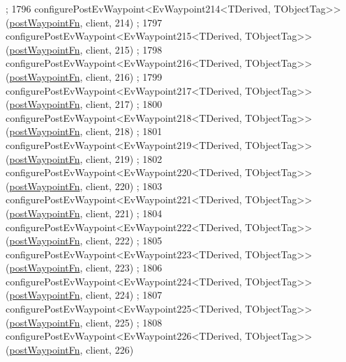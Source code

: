 \begin{DoxyCode}
      ;
1796     configurePostEvWaypoint<EvWaypoint214<TDerived, TObjectTag>>(\hyperlink{classcl__move__base__z_1_1WaypointEventDispatcher_a964a57fcce5d48ec60243230722d8dd7}{postWaypointFn}, client, 214)
      ;
1797     configurePostEvWaypoint<EvWaypoint215<TDerived, TObjectTag>>(\hyperlink{classcl__move__base__z_1_1WaypointEventDispatcher_a964a57fcce5d48ec60243230722d8dd7}{postWaypointFn}, client, 215)
      ;
1798     configurePostEvWaypoint<EvWaypoint216<TDerived, TObjectTag>>(\hyperlink{classcl__move__base__z_1_1WaypointEventDispatcher_a964a57fcce5d48ec60243230722d8dd7}{postWaypointFn}, client, 216)
      ;
1799     configurePostEvWaypoint<EvWaypoint217<TDerived, TObjectTag>>(\hyperlink{classcl__move__base__z_1_1WaypointEventDispatcher_a964a57fcce5d48ec60243230722d8dd7}{postWaypointFn}, client, 217)
      ;
1800     configurePostEvWaypoint<EvWaypoint218<TDerived, TObjectTag>>(\hyperlink{classcl__move__base__z_1_1WaypointEventDispatcher_a964a57fcce5d48ec60243230722d8dd7}{postWaypointFn}, client, 218)
      ;
1801     configurePostEvWaypoint<EvWaypoint219<TDerived, TObjectTag>>(\hyperlink{classcl__move__base__z_1_1WaypointEventDispatcher_a964a57fcce5d48ec60243230722d8dd7}{postWaypointFn}, client, 219)
      ;
1802     configurePostEvWaypoint<EvWaypoint220<TDerived, TObjectTag>>(\hyperlink{classcl__move__base__z_1_1WaypointEventDispatcher_a964a57fcce5d48ec60243230722d8dd7}{postWaypointFn}, client, 220)
      ;
1803     configurePostEvWaypoint<EvWaypoint221<TDerived, TObjectTag>>(\hyperlink{classcl__move__base__z_1_1WaypointEventDispatcher_a964a57fcce5d48ec60243230722d8dd7}{postWaypointFn}, client, 221)
      ;
1804     configurePostEvWaypoint<EvWaypoint222<TDerived, TObjectTag>>(\hyperlink{classcl__move__base__z_1_1WaypointEventDispatcher_a964a57fcce5d48ec60243230722d8dd7}{postWaypointFn}, client, 222)
      ;
1805     configurePostEvWaypoint<EvWaypoint223<TDerived, TObjectTag>>(\hyperlink{classcl__move__base__z_1_1WaypointEventDispatcher_a964a57fcce5d48ec60243230722d8dd7}{postWaypointFn}, client, 223)
      ;
1806     configurePostEvWaypoint<EvWaypoint224<TDerived, TObjectTag>>(\hyperlink{classcl__move__base__z_1_1WaypointEventDispatcher_a964a57fcce5d48ec60243230722d8dd7}{postWaypointFn}, client, 224)
      ;
1807     configurePostEvWaypoint<EvWaypoint225<TDerived, TObjectTag>>(\hyperlink{classcl__move__base__z_1_1WaypointEventDispatcher_a964a57fcce5d48ec60243230722d8dd7}{postWaypointFn}, client, 225)
      ;
1808     configurePostEvWaypoint<EvWaypoint226<TDerived, TObjectTag>>(\hyperlink{classcl__move__base__z_1_1WaypointEventDispatcher_a964a57fcce5d48ec60243230722d8dd7}{postWaypointFn}, client, 226)

\end{DoxyCode}

